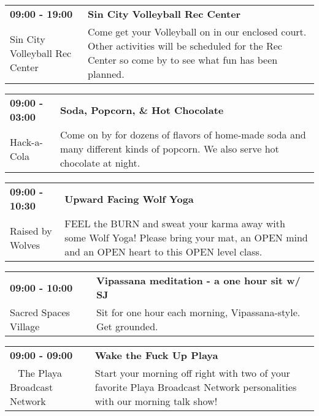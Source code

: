 \begin{tabular}{ p{1in} p{2.2in} }
    \textbf{09:00 - 19:00} & \textbf{Sin City Volleyball Rec Center} \\
    Sin City Volleyball Rec Center \newline  & Come get your Volleyball on in our enclosed court. Other activities will be scheduled for the Rec Center so come by to see what fun has been planned. \\
    \hline 
\end{tabular}
    
\begin{tabular}{ p{1in} p{2.2in} }
    \textbf{09:00 - 03:00} & \textbf{Soda, Popcorn, \& Hot Chocolate} \\
    Hack-a-Cola \newline  & Come on by for dozens of flavors of home-made soda and many different kinds of popcorn. We also serve hot chocolate at night. \\
    \hline 
\end{tabular}
    
\begin{tabular}{ p{1in} p{2.2in} }
    \textbf{09:00 - 10:30} & \textbf{Upward Facing Wolf Yoga} \\
    Raised by Wolves \newline  & FEEL the BURN and sweat your karma away with some Wolf Yoga! Please bring your mat, an OPEN mind and an OPEN heart to this OPEN level class. \\
    \hline 
\end{tabular}
    
\begin{tabular}{ p{1in} p{2.2in} }
    \textbf{09:00 - 10:00} & \textbf{Vipassana meditation - a one hour sit w/ SJ} \\
    Sacred Spaces Village \newline  & Sit for one hour each morning, Vipassana-style. Get grounded. \\
    \hline 
\end{tabular}
    
\begin{tabular}{ p{1in} p{2.2in} }
    \textbf{09:00 - 09:00} & \textbf{Wake the Fuck Up Playa} \\
    ~ \newline The Playa Broadcast Network & Start your morning off right with two of your favorite Playa Broadcast Network personalities with our morning talk show! \\
    \hline 
\end{tabular}
    

